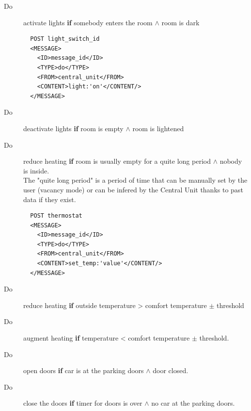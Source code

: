 \documentclass{acm_proc_article-sp}
\begin{document}
\begin{description}
 \item[Do] activate lights \textbf{if} somebody enters the room $\land$ room is dark\\
 
\begin{minipage}{\linewidth}
\begin{lstlisting}
  POST light_switch_id 
  <MESSAGE>
    <ID>message_id</ID>
    <TYPE>do</TYPE>
    <FROM>central_unit</FROM>
    <CONTENT>light:'on'</CONTENT/>
  </MESSAGE> 
\end{lstlisting}
\end{minipage}

 \item[Do] deactivate lights \textbf{if} room is empty $\land$ room is lightened
 \item[Do] reduce heating \textbf{if} room is usually empty for a quite long period $\land$ nobody is inside.\\
 The "quite long period" is a period of time that can be manually set by the user (vacancy mode) or can be infered by the Central Unit thanks to past data if they exist.
 
 \begin{minipage}{\linewidth}
\begin{lstlisting}
  POST thermostat 
  <MESSAGE>
    <ID>message_id</ID>
    <TYPE>do</TYPE>
    <FROM>central_unit</FROM>
    <CONTENT>set_temp:'value'</CONTENT/>
  </MESSAGE> 
\end{lstlisting}
\end{minipage}

 \item[Do] reduce heating \textbf{if} outside temperature > comfort temperature $\pm$ threshold
 \item[Do] augment heating \textbf{if} temperature < comfort temperature $\pm$ threshold.
 \item[Do] open doors \textbf{if} car is at the parking doors $\land$ door closed.
 \item[Do] close the doors \textbf{if} timer for doors is over $\land$ no car at the parking doors.\\
 

\end{description}
\end{document}
